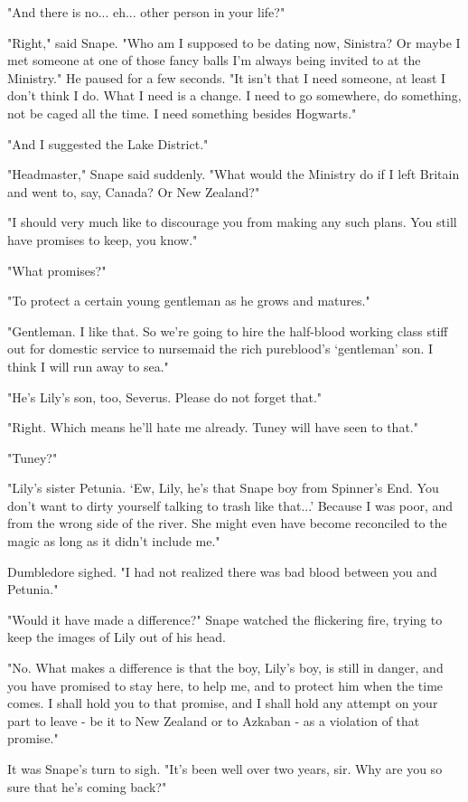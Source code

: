 "And there is no... eh... other person in your life?"

"Right," said Snape. "Who am I supposed to be dating now, Sinistra? Or maybe I met someone at one of those fancy balls I'm always being invited to at the Ministry." He paused for a few seconds. "It isn't that I need someone, at least I don't think I do. What I need is a change. I need to go somewhere, do something, not be caged all the time. I need something besides Hogwarts."

"And I suggested the Lake District."

"Headmaster," Snape said suddenly. "What would the Ministry do if I left Britain and went to, say, Canada? Or New Zealand?"

"I should very much like to discourage you from making any such plans. You still have promises to keep, you know."

"What promises?"

"To protect a certain young gentleman as he grows and matures."

"Gentleman. I like that. So we're going to hire the half-blood working class stiff out for domestic service to nursemaid the rich pureblood's `gentleman' son. I think I will run away to sea."

"He's Lily's son, too, Severus. Please do not forget that."

"Right. Which means he'll hate me already. Tuney will have seen to that."

"Tuney?"

"Lily's sister Petunia. `Ew, Lily, he's that Snape boy from Spinner's End. You don't want to dirty yourself talking to trash like that...' Because I was poor, and from the wrong side of the river. She might even have become reconciled to the magic as long as it didn't include me."

Dumbledore sighed. "I had not realized there was bad blood between you and Petunia."

"Would it have made a difference?" Snape watched the flickering fire, trying to keep the images of Lily out of his head.

"No. What makes a difference is that the boy, Lily's boy, is still in danger, and you have promised to stay here, to help me, and to protect him when the time comes. I shall hold you to that promise, and I shall hold any attempt on your part to leave - be it to New Zealand or to Azkaban - as a violation of that promise."

It was Snape's turn to sigh. "It's been well over two years, sir. Why are you so sure that he's coming back?"

